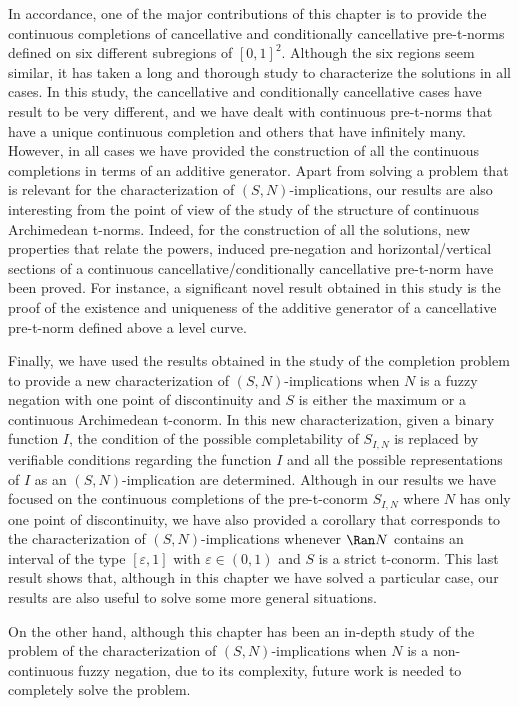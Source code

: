 In accordance, one of the major contributions of this chapter is to provide the continuous completions of cancellative and conditionally cancellative pre-t-norms defined on six different subregions of $[0,1]^2$. Although the six regions seem similar, it has taken a long and thorough study to characterize the solutions in all cases. In this study, the cancellative and conditionally cancellative cases have result to be very different, and we have dealt with continuous pre-t-norms that have a unique continuous completion and others that have infinitely many. However, in all cases we have provided the construction of all the continuous completions in terms of an additive generator. Apart from solving a problem that is relevant for the characterization of $(S,N)$-implications, our results are also interesting from the point of view of the study of the structure of continuous Archimedean t-norms. Indeed, for the construction of all the solutions, new properties that relate the powers, induced pre-negation and horizontal/vertical sections of a continuous cancellative/conditionally cancellative pre-t-norm have been proved. For instance, a significant novel result obtained in this study is the proof of the existence and uniqueness of the additive generator of a cancellative pre-t-norm defined above a level curve.

Finally, we have used the results obtained in the study of the completion problem to provide a new characterization of $(S,N)$-implications when $N$ is a fuzzy negation with one point of discontinuity and $S$ is either the maximum or a continuous Archimedean t-conorm. In this new characterization, given a binary function $I$, the condition of the possible completability of $S_{I,N}$ is replaced by verifiable conditions regarding the function $I$ and all the possible representations of $I$ as an $(S,N)$-implication are determined. Although in our results we have focused on the continuous completions of the pre-t-conorm $S_{I,N}$ where $N$ has only one point of discontinuity, we have also provided a corollary that corresponds to the characterization of $(S,N)$-implications whenever $\Ran N$ contains an interval of the type $[\varepsilon,1]$ with $\varepsilon \in (0,1)$ and $S$ is a strict t-conorm. This last result shows that, although in this chapter we have solved a particular case, our results are also useful to solve some more general situations. 

On the other hand, although this chapter has been an in-depth study of the problem of the characterization of $(S,N)$-implications when $N$ is a non-continuous fuzzy negation, due to its complexity, future work is needed to completely solve the problem. 

